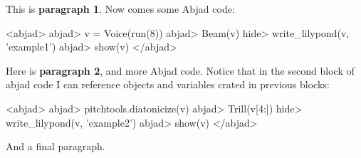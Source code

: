 \documentclass[11pt]{article}
\begin{document}
This is \textbf{paragraph 1}.
Now comes some Abjad code:

<abjad>
   abjad> v = Voice(run(8))
   abjad> Beam(v)
   hide> write_lilypond(v, 'example1')
   abjad> show(v)
</abjad>

Here is \textbf{paragraph 2}, and more Abjad code. Notice that in the second block of abjad code I can reference objects and variables crated in previous blocks:

<abjad>
   abjad> pitchtools.diatonicize(v)
   abjad> Trill(v[4:])
   hide> write_lilypond(v, 'example2')
   abjad> show(v)
</abjad>

And a final paragraph.
\end{document}
